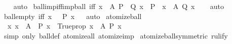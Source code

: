 \begin{isabellebody}
%
\isadelimproof
\ \ %
\endisadelimproof
%
\isatagproof
{}\isamarkupfalse%
\ auto%
\endisatagproof
{\isafoldproof}%
%
\isadelimproof
\isanewline
%
\endisadelimproof
\isanewline
{}\isamarkupfalse%
\ ball{\isacharunderscore}{\kern0pt}imp{\isacharunderscore}{\kern0pt}iff{\isacharunderscore}{\kern0pt}imp{\isacharunderscore}{\kern0pt}ball\ {\isacharbrackleft}{\kern0pt}iff{\isacharbrackright}{\kern0pt}{\isacharcolon}{\kern0pt}\ {\isachardoublequoteopen}{\isacharparenleft}{\kern0pt}{\isasymforall}x\ {\isasymin}\ A{\isachardot}{\kern0pt}\ P\ {\isasymlongrightarrow}\ Q\ x{\isacharparenright}{\kern0pt}\ {\isasymlongleftrightarrow}\ {\isacharparenleft}{\kern0pt}P\ {\isasymlongrightarrow}\ {\isacharparenleft}{\kern0pt}{\isasymforall}x\ {\isasymin}\ A{\isachardot}{\kern0pt}\ Q\ x{\isacharparenright}{\kern0pt}{\isacharparenright}{\kern0pt}{\isachardoublequoteclose}\isanewline
%
\isadelimproof
\ \ %
\endisadelimproof
%
\isatagproof
{}\isamarkupfalse%
\ auto%
\endisatagproof
{\isafoldproof}%
%
\isadelimproof
\isanewline
%
\endisadelimproof
\isanewline
{}\isamarkupfalse%
\ ball{\isacharunderscore}{\kern0pt}empty\ {\isacharbrackleft}{\kern0pt}iff{\isacharbrackright}{\kern0pt}{\isacharcolon}{\kern0pt}\ {\isachardoublequoteopen}{\isasymforall}x\ {\isasymin}\ {\isacharbraceleft}{\kern0pt}{\isacharbraceright}{\kern0pt}{\isachardot}{\kern0pt}\ P\ x{\isachardoublequoteclose}%
\isadelimproof
\ %
\endisadelimproof
%
\isatagproof
{}\isamarkupfalse%
\ auto%
\endisatagproof
{\isafoldproof}%
%
\isadelimproof
%
\endisadelimproof
\isanewline
\isanewline
{}\isamarkupfalse%
\ atomize{\isacharunderscore}{\kern0pt}ball{\isacharcolon}{\kern0pt}\isanewline
\ \ {\isachardoublequoteopen}{\isacharparenleft}{\kern0pt}{\isasymAnd}x{\isachardot}{\kern0pt}\ x\ {\isasymin}\ A\ {\isasymLongrightarrow}\ P\ x{\isacharparenright}{\kern0pt}\ {\isasymequiv}\ Trueprop\ {\isacharparenleft}{\kern0pt}{\isasymforall}x\ {\isasymin}\ A{\isachardot}{\kern0pt}\ P\ x{\isacharparenright}{\kern0pt}{\isachardoublequoteclose}\isanewline
%
\isadelimproof
\ \ %
\endisadelimproof
%
\isatagproof
{}\isamarkupfalse%
\ {\isacharparenleft}{\kern0pt}simp\ only{\isacharcolon}{\kern0pt}\ ball{\isacharunderscore}{\kern0pt}def\ atomize{\isacharunderscore}{\kern0pt}all\ atomize{\isacharunderscore}{\kern0pt}imp{\isacharparenright}{\kern0pt}%
\endisatagproof
{\isafoldproof}%
%
\isadelimproof
\isanewline
%
\endisadelimproof
\isanewline
{}\isamarkupfalse%
\ atomize{\isacharunderscore}{\kern0pt}ball{\isacharbrackleft}{\kern0pt}symmetric{\isacharcomma}{\kern0pt}\ rulify{\isacharbrackright}{\kern0pt}\isanewline

\end{isabellebody}

